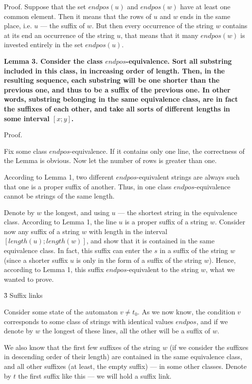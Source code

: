 Proof. Suppose that the set $endpos(u)$ and $endpos(w)$ have at least one common element. Then it means that the rows of $u$ and $w$ ends in the same place, i.e. $u$ --- the suffix of $w$. But then every occurrence of the string $w$ contains at its end an occurrence of the string $u$, that means that it many $endpos(w)$ is invested entirely in the set $endpos(u)$.

\bf{Lemma 3}. Consider the class $endpos$-equivalence. Sort all substring included in this class, in increasing order of length. Then, in the resulting sequence, each substring will be one shorter than the previous one, and thus to be a suffix of the previous one. In other words, \bf{substring belonging in the same equivalence class, are in fact the suffixes of each other, and take all sorts of different lengths in some interval $[x;y]$}.

Proof.

Fix some class $endpos$-equivalence. If it contains only one line, the correctness of the Lemma is obvious. Now let the number of rows is greater than one.

According to Lemma 1, two different $endpos$-equivalent strings are always such that one is a proper suffix of another. Thus, in one class $endpos$-equivalence cannot be strings of the same length.

Denote by $w$ the longest, and using $u$ --- the shortest string in the equivalence class. According to Lemma 1, the line $u$ is a proper suffix of a string $w$. Consider now any suffix of a string $w$ with length in the interval $[length(u); length(w)]$, and show that it is contained in the same equivalence class. In fact, this suffix can enter the $s$ in a suffix of the string $w$ (since a shorter suffix $u$ is only in the form of a suffix of the string $w$). Hence, according to Lemma 1, this suffix $endpos$-equivalent to the string $w$, what we wanted to prove.


\h3{ Suffix links }

Consider some state of the automaton $v \ne t_0$. As we now know, the condition $v$ corresponds to some class of strings with identical values $endpos$, and if we denote by $w$ the longest of these lines, all the other will be a suffix of $w$.

We also know that the first few suffixes of the string $w$ (if we consider the suffixes in descending order of their length) are contained in the same equivalence class, and all other suffixes (at least, the empty suffix) --- in some other classes. Denote by $t$ the first suffix like this --- we will hold a suffix link.

